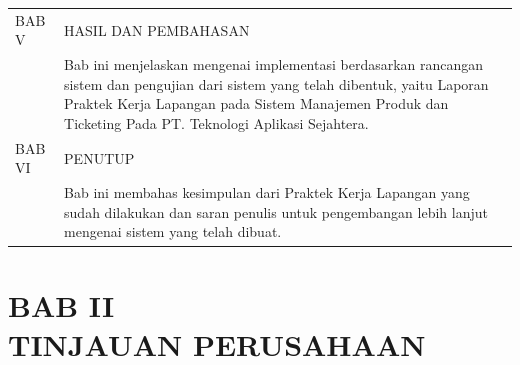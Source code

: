 \documentclass[12pt]{article}
\begin{document}
\begin{enumerate}[label=\textbf{1.\arabic*.}]
    \begin{tabularx}{.9\linewidth}{@{}  l X @{}}
        
        BAB V & HASIL DAN PEMBAHASAN \\
        & Bab ini menjelaskan mengenai implementasi berdasarkan rancangan sistem dan pengujian dari sistem yang telah dibentuk, yaitu Laporan Praktek Kerja Lapangan pada Sistem Manajemen Produk dan Ticketing Pada PT. Teknologi Aplikasi Sejahtera. \\
        BAB VI & PENUTUP \\
        & Bab ini membahas kesimpulan dari Praktek Kerja Lapangan yang sudah dilakukan dan saran penulis untuk pengembangan lebih lanjut mengenai sistem yang telah dibuat. \\
    \end{tabularx}

    
\end{enumerate}

\newpage



\section[BAB II TINJAUAN PERUSAHAAN]{BAB II\\TINJAUAN PERUSAHAAN}
\setcounter{table}{0}
\setcounter{figure}{0}
\end{document}
